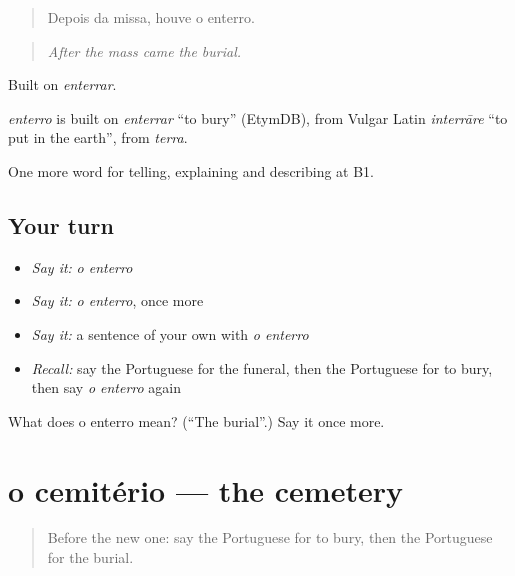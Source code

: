 \begin{quote}
Depois da missa, houve o enterro.
\end{quote}

\begin{quote}
\emph{After the mass came the burial.}
\end{quote}

Built on \emph{enterrar}.

\begin{cousinweb}
\emph{enterro} is built on \emph{enterrar} \textquotedblleft{}to bury\textquotedblright{} (EtymDB), from Vulgar Latin \emph{interrāre} \textquotedblleft{}to put in the earth\textquotedblright{}, from \emph{terra}.
\end{cousinweb}

\begin{grammarlens}[title={What you've built}]
One more word for telling, explaining and describing at B1.
\end{grammarlens}

\subsection*{Your turn}
\begin{itemize}
\raggedright
  \item \emph{Say it:} \emph{o enterro}
  \item \emph{Say it:} \emph{o enterro}, once more
  \item \emph{Say it:} a sentence of your own with \emph{o enterro}
  \item \emph{Recall:} say the Portuguese for the funeral, then the Portuguese for to bury, then say \emph{o enterro} again
\end{itemize}

\begin{tcolorbox}[breakable,colback=teal!4,colframe=teal!35!black,title={Before you move on}]
What does o enterro mean? (\textquotedblleft{}The burial\textquotedblright{}.) Say it once more.
\end{tcolorbox}
\section[o cemitério]{o cemitério — the cemetery}

\label{lesson:PT-C315-cemiterio}



\begin{quote}
Before the new one: say the Portuguese for to bury, then the Portuguese for the burial.
\end{quote}


